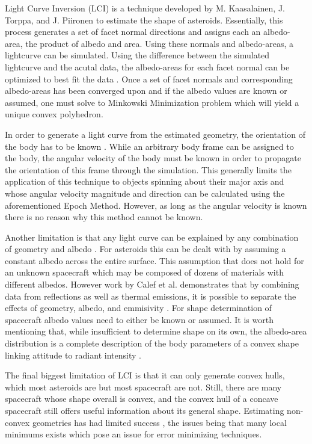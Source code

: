 \documentclass{article}
\begin{document}
Light Curve Inversion (LCI) is a technique developed by M. Kaasalainen, J. Torppa, and J. Piironen \cite{KAASALAINEN2002369} to estimate the shape of asteroids. Essentially, this process generates a set of facet normal directions and assigns each an albedo-area, the product of albedo and area. Using these normals and albedo-areas, a lightcurve can be simulated. Using the difference between the simulated lightcurve and the acutal data, the albedo-areas for each facet normal can be optimized to best fit the data \cite{Kaasalainen}. Once a set of facet normals and corresponding albedo-areas has been converged upon and if the albedo values are known or assumed, one must solve to Minkowski Minimization problem \cite{Minkowski1989} which will yield a unique convex polyhedron.

In order to generate a light curve from the estimated geometry, the orientation of the body has to be known \cite{PSI}. While an arbitrary body frame can be assigned to the body, the angular velocity of the body must be known in order to propagate the orientation of this frame through the simulation. This generally limits the application of this technique to objects spinning about their major axis and whose angular velocity magnitude and direction can be calculated using the aforementioned Epoch Method. However, as long as the angular velocity is known there is no reason why this method cannot be known.

Another limitation is that any light curve can be explained by any combination of geometry and albedo \cite{Magnusson1989DeterminationOP}. For asteroids this can be dealt with by assuming a constant albedo across the entire surface. This assumption that does not hold for an unknown spacecraft which may be composed of dozens of materials with different albedos. However work by Calef et al. \cite{Separating} demonstrates that by combining data from reflections as well as thermal emissions, it is possible to separate the effects of geometry, albedo, and emmisivity \cite{PSI}. For shape determination of spacecraft albedo values need to either be known or assumed. It is worth mentioning that, while insufficient to determine shape on its own, the albedo-area distribution is a complete description of the body parameters of a convex shape linking attitude to radiant intensity \cite{Separating}.

The final biggest limitation of LCI is that it can only generate convex hulls, which most asteroids are but most spacecraft are not. Still, there are many spacecraft whose shape overall is convex, and the convex hull of a concave spacecraft still offers useful information about its general shape. Estimating non-convex geometries has had limited success \cite{Kaasalainen}, the issues being that many local minimums exists which pose an issue for error minimizing techniques.
\end{document}
